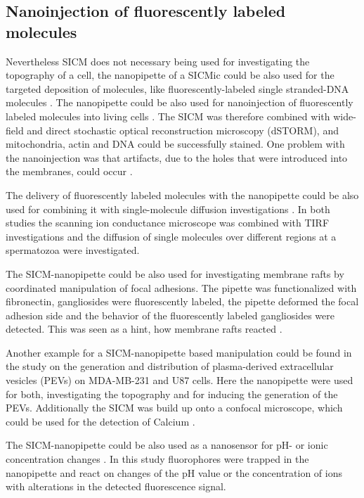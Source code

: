 \subsection{Nanoinjection of fluorescently labeled molecules}

Nevertheless SICM does not necessary being used for investigating the topography of a cell, 
the nanopipette of a SICMic could be also used for the targeted deposition of molecules, like 
fluorescently-labeled single stranded-DNA molecules \cite{Ying2002,Hennig2015}. The nanopipette 
could be also used for nanoinjection of fluorescently labeled molecules into living cells 
\cite{Hennig2015a}. The SICM was therefore combined with wide-field and direct stochastic 
optical reconstruction microscopy (dSTORM), and mitochondria, actin and DNA could be successfully 
stained. One problem with the nanoinjection was that artifacts, due to the holes that were 
introduced into the membranes, could occur \cite{Hennig2015a}.

The delivery of fluorescently labeled molecules with the nanopipette could be also used for 
combining it with single-molecule diffusion investigations \cite{Bruckbauer2007, Bruckbauer2010}. 
In both studies the scanning ion conductance microscope was combined with TIRF investigations and 
the diffusion of single molecules over different regions at a spermatozoa were investigated. 


The SICM-nanopipette could be also used for investigating membrane rafts 
\cite{Simons1997,Pike2006} by coordinated manipulation of focal adhesions. The pipette was 
functionalized with fibronectin, gangliosides were fluorescently labeled, the pipette deformed the 
focal adhesion side and the behavior of the fluorescently labeled gangliosides were detected. This 
was seen as a hint, how membrane rafts reacted \cite{Fuentes2012}. 

Another example for a SICM-nanopipette based manipulation could be found in the study on the 
generation and distribution of plasma-derived extracellular vesicles (PEVs) on MDA-MB-231 and U87 
cells. Here the nanopipette were used for both, investigating the topography and for inducing the 
generation of the PEVs. Additionally the SICM was build up onto a confocal microscope, which could 
be used for the detection of Calcium \cite{Wang2020}.

The SICM-nanopipette could be also used as a nanosensor for pH- or ionic concentration changes 
\cite{Piper2006}. In this study fluorophores were trapped in the nanopipette and react on changes 
of the pH value or the concentration of ions with alterations in the detected fluorescence signal.

